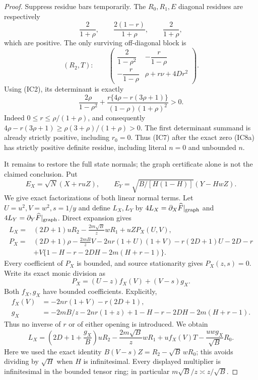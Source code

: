 \begin{proof}
Suppress residue bars temporarily. The $R_0,R_1,E$ diagonal
residues are respectively
\[
 \frac2{1+\rho},\qquad
 \frac{2(1-r)}{1+\rho},\qquad
 \frac2{1+\rho},
\]
which are positive. The only surviving off-diagonal block is
\[
 (R_2,T):\qquad
 \begin{pmatrix}
 \dfrac2{1-\rho^2}&-\dfrac r{1-\rho}\\[3pt]
 -\dfrac r{1-\rho}&\rho+r\nu+4Dr^2
 \end{pmatrix}.                                      \tag{IC9}
\]
Using (IC2), its determinant is exactly
\[
 \frac{2\rho}{1-\rho^2}
  +\frac{r\{4\rho-r(3\rho+1)\}}
       {(1-\rho)(1+\rho)^2}>0.
\]
Indeed $0\le r\le\rho/(1+\rho)$, and consequently
$4\rho-r(3\rho+1)\ge\rho(3+\rho)/(1+\rho)>0$.
The first determinant summand is already strictly positive, including
$r_0=0$. Thus (IC7) after the exact zero (IC8a) has strictly positive
definite residue, including literal $n=0$ and unbounded $n$.

It remains to restore the full state normals; the graph certificate
alone is not the claimed conclusion. Put
\[
 E_X=\sqrt N(X+ruZ),\qquad E_Y=\sqrt{B/[H(1-H)]}(Y-HwZ).
\]
We give exact factorizations of both linear normal terms. Let
$U=u^2,V=w^2,s=1/y$ and define $L_X,L_Y$ by
$4L_X=\partial_X\widehat F|_{\rm graph}$ and
$4L_Y=\partial_Y\widehat F|_{\rm graph}$. Direct expansion gives
\begin{align*}
 L_X={}&(2D+1)uR_2-\frac{2m\sqrt B}{z}wR_1+uZP_X(U,V),\\
 P_X={}&(2D+1)\rho-\frac{2mB}{z}V
    -2nr(1+U)(1+V)-r(2D+1)U-2D-r\\
 &+V\{1-H-r-2DH-2m(H+r-1)\}.                         \tag{IC10}
\end{align*}
Every coefficient of $P_X$ is bounded, and source stationarity gives
$P_X(z,s)=0$. Write its exact monic division as
\[
 P_X=(U-z)f_X(V)+(V-s)g_X.
\]
Both $f_X,g_X$ have bounded coefficients. Explicitly,
\begin{align*}
 f_X(V)&=-2nr(1+V)-r(2D+1),\\
 g_X&=-2mB/z-2nr(1+z)+1-H-r-2DH-2m(H+r-1).
\end{align*}
Thus no inverse of $r$ or of either opening is introduced. We obtain
\[
 L_X=\left(2D+1+\frac{g_X}B\right)uR_2
       -\frac{2m\sqrt B}{z}wR_1
       +u f_X(V)T
       -\frac{uwg_X}{\sqrt B}R_0.                       \tag{IC11}
\]
Here we used the exact identity
$B(V-s)Z=R_2-\sqrt B\,wR_0$; this avoids dividing by $\sqrt H$
when $H$ is infinitesimal. Every displayed multiplier is infinitesimal
in the bounded tensor ring; in particular $m\sqrt B/z\asymp z/\sqrt B$.


\end{proof}
